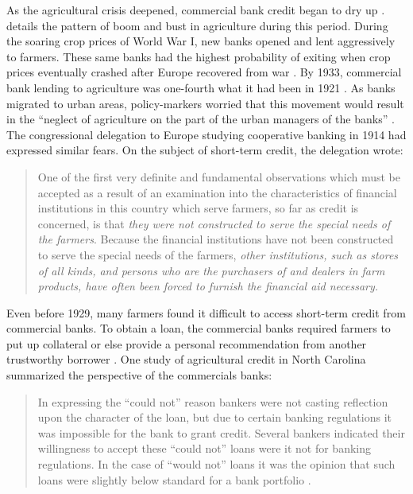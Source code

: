 \documentclass[12pt]{article}
\begin{document}
As the agricultural crisis deepened, commercial bank credit began to dry up \citep{alston_why_1994,jaremski_banking_2020}.
\citet{jaremski_banking_2020} details the pattern of boom and bust in agriculture during this period.
During the soaring crop prices of World War I, new banks opened and lent aggressively to farmers.
These same banks had the highest probability of exiting when crop prices eventually crashed after Europe recovered from war \citep{jaremski_banking_2020}.
By 1933, commercial bank lending to agriculture was one-fourth what it had been in 1921 \citep{american_institute_of_banking_farm_1934}.
As banks migrated to urban areas, policy-markers worried that this movement would result in the ``neglect of agriculture on the part of the urban managers of the banks'' \citep[pg.49]{noauthor_social_1927}.  
The congressional delegation to Europe studying cooperative banking in 1914 had expressed similar fears.
On the subject of short-term credit, the delegation wrote:

\begin{quote}
One of the first very definite and fundamental observations which must be accepted as a result of an examination into the characteristics of financial institutions in this country which serve farmers, so far as credit is concerned, is that \textit{they were not constructed to serve the special needs of the farmers}.
Because the financial institutions have not been constructed to serve the special needs of the farmers, \textit{other institutions, such as stores of all kinds, and persons who are the purchasers of and dealers in farm products, have often been forced to furnish the financial aid necessary.} \citep[pg. 10, emphasis added.]{united_states_agricultural_1914}
\end{quote}

Even before 1929, many farmers found it difficult to access short-term credit from commercial banks. 
To obtain a loan, the commercial banks required farmers to put up collateral or else provide a personal recommendation from another trustworthy borrower \citep{american_institute_of_banking_farm_1934}.
One study of agricultural credit in North Carolina summarized the perspective of the commercials banks:

\begin{quote}
    In expressing the ``could not'' reason bankers were not casting reflection upon the character of the loan, but due to certain banking regulations it was impossible for the bank to grant credit. Several bankers indicated their willingness to accept these ``could not'' loans were it not for banking regulations. In the case of ``would not'' loans it was the opinion that such loans were slightly below standard for a bank portfolio \citep[pg. 82]{Lange1944}.
    \end{quote}
\end{document}
